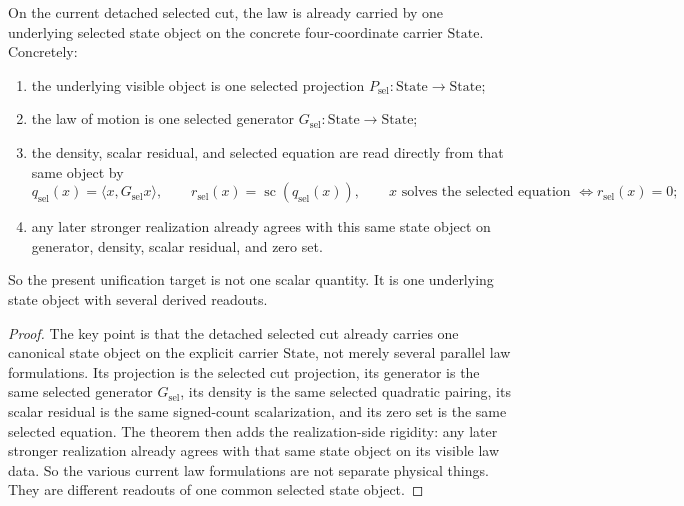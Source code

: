 \begin{theorem}
\label{thm:the-detached-selected-law-already-has-one-underlying-state-object}
On the current detached selected cut, the law is already carried by one
underlying selected state object on the concrete four-coordinate carrier
\(\mathrm{State}\). Concretely:
\begin{enumerate}
\item the underlying visible object is one selected projection
      \(P_{\mathrm{sel}} : \mathrm{State}\to\mathrm{State}\);
\item the law of motion is one selected generator
      \(G_{\mathrm{sel}} : \mathrm{State}\to\mathrm{State}\);
\item the density, scalar residual, and selected equation are read directly
      from that same object by
\[
q_{\mathrm{sel}}(x)=\langle x,G_{\mathrm{sel}}x\rangle,\qquad
r_{\mathrm{sel}}(x)=\operatorname{sc}(q_{\mathrm{sel}}(x)),\qquad
x \text{ solves the selected equation } \Longleftrightarrow
      r_{\mathrm{sel}}(x)=0;
\]
\item any later stronger realization already agrees with this same
      state object on generator, density, scalar residual, and zero set.
\end{enumerate}
So the present unification target is not one scalar quantity. It is one
underlying state object with several derived readouts.
\end{theorem}

\begin{proof}
The key point is that the detached selected cut already carries one canonical
state object on the explicit carrier \(\mathrm{State}\), not merely several
parallel law formulations. Its projection is the selected cut projection, its
generator is the same selected generator \(G_{\mathrm{sel}}\), its density is
the same selected quadratic pairing, its scalar residual is the same
signed-count scalarization, and its zero set is the same selected equation.
The theorem then adds the realization-side rigidity: any later stronger
realization already agrees with that same state object on its visible
law data. So the various current law formulations are not separate physical
things. They are different readouts of one common selected state object.
\end{proof}

